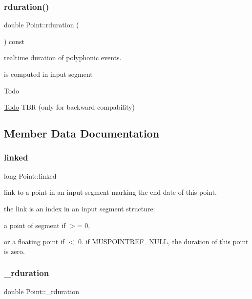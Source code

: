 \subsubsection{\texorpdfstring{rduration()}{rduration()}}
{\footnotesize\ttfamily double Point\+::rduration (\begin{DoxyParamCaption}{ }\end{DoxyParamCaption}) const\hspace{0.3cm}{\ttfamily [inline]}}



realtime duration of polyphonic events. 

is computed in input segment

\begin{DoxyRefDesc}{Todo}
\item[\mbox{\hyperlink{todo__todo000028}{Todo}}]T\+BR (only for backward compability) \end{DoxyRefDesc}


\subsection{Member Data Documentation}
\mbox{\label{classPoint_a11ca880bad16051872c032fa47b73e42}} 
\subsubsection{\texorpdfstring{linked}{linked}}
{\footnotesize\ttfamily long Point\+::linked}



link to a point in an input segment marking the end date of this point. 

the link is an index in an input segment structure\+:
\begin{DoxyItemize}
\item a point of segment if $>$= 0,
\item or a floating point if $<$ 0. if M\+U\+S\+P\+O\+I\+N\+T\+R\+E\+F\+\_\+\+N\+U\+LL, the duration of this point is zero. 
\end{DoxyItemize}\mbox{\label{classPoint_a706ce56822f7e26dc66d67ce225d8a94}} 
\subsubsection{\texorpdfstring{\_rduration}{\_rduration}}
{\footnotesize\ttfamily double Point\+::\+\_\+rduration\hspace{0.3cm}{\ttfamily [protected]}}



